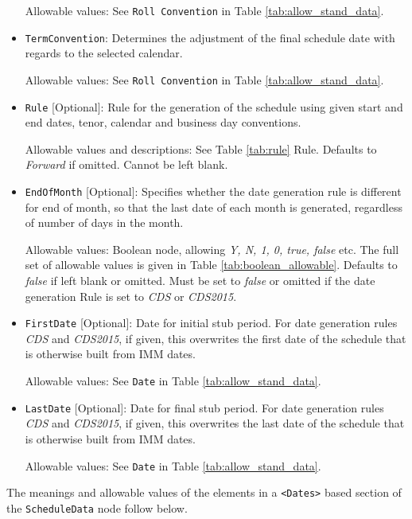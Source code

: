 \begin{itemize}
Allowable values: See \lstinline!Roll Convention! in Table
\ref{tab:allow_stand_data}.

\item \lstinline!TermConvention!: Determines the adjustment of the final schedule
  date with regards to the selected calendar. 

Allowable values: See \lstinline!Roll Convention! in Table \ref{tab:allow_stand_data}.

\item \lstinline!Rule! [Optional]: Rule for the generation of the schedule using given
  start and end dates, tenor, calendar and business day conventions. 

Allowable values and descriptions: See Table \ref{tab:rule} Rule. Defaults to \emph{Forward} if omitted. Cannot be left blank.

\item \lstinline!EndOfMonth! [Optional]: Specifies whether the date generation rule is different for end of month, so that the last date of each month is generated, regardless of number of days in the month.

Allowable values: Boolean node, allowing \emph{Y, N, 1, 0, true, false} etc. The full set of allowable values is given in Table \ref{tab:boolean_allowable}. Defaults to \emph{false} if left blank or omitted. Must be set to \emph{false} or omitted if the date generation Rule is set to \emph{CDS} or \emph{CDS2015}.

\item \lstinline!FirstDate! [Optional]: Date for initial stub period. For date generation rules \emph{CDS} and \emph{CDS2015}, if given, this
  overwrites the first date of the schedule that is otherwise built from IMM dates.

Allowable values: See \lstinline!Date! in Table \ref{tab:allow_stand_data}.

\item \lstinline!LastDate! [Optional]: Date for final stub period. For date generation rules \emph{CDS} and \emph{CDS2015}, if given, this
  overwrites the last date of the schedule that is otherwise built from IMM dates.

Allowable values: See \lstinline!Date! in Table \ref{tab:allow_stand_data}.
\end{itemize}

\medskip
The meanings and allowable values of the elements in a {\tt <Dates>} based section of the  \lstinline!ScheduleData! node follow below.

